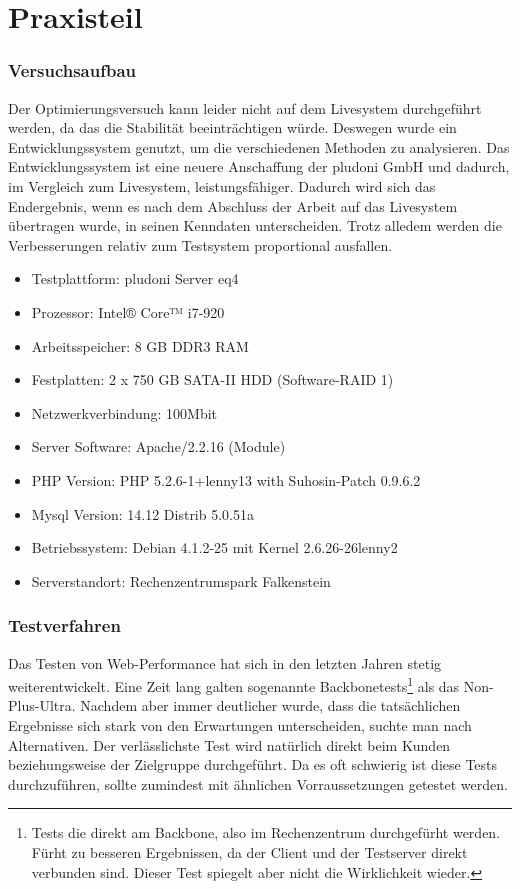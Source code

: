 \part{Praxisteil}

\section{Versuchsaufbau}
Der Optimierungsversuch kann leider nicht auf dem Livesystem durchgeführt werden, da das die Stabilität beeinträchtigen würde. Deswegen wurde ein Entwicklungssystem genutzt, um die verschiedenen Methoden zu analysieren. Das Entwicklungssystem ist eine neuere Anschaffung der pludoni GmbH und dadurch, im Vergleich zum Livesystem, leistungsfähiger. Dadurch wird sich das Endergebnis, wenn es nach dem Abschluss der Arbeit auf das Livesystem übertragen wurde, in seinen Kenndaten unterscheiden. Trotz alledem werden die Verbesserungen relativ zum Testsystem proportional ausfallen. 

\begin{itemize}
 \item Testplattform: pludoni Server eq4
  \item Prozessor: Intel® Core™ i7-920 
  \item Arbeitsspeicher: 8 GB DDR3 RAM
  \item Festplatten: 2 x 750 GB SATA-II HDD (Software-RAID 1)
  \item Netzwerkverbindung: 100Mbit
  \item Server Software: Apache/2.2.16 (Module)
  \item PHP Version: PHP 5.2.6-1+lenny13 with Suhosin-Patch 0.9.6.2
  \item Mysql Version: 14.12 Distrib 5.0.51a 
  \item Betriebssystem: Debian 4.1.2-25 mit Kernel 2.6.26-26lenny2
  \item Serverstandort: Rechenzentrumspark Falkenstein
\end{itemize}

\section{Testverfahren}
Das Testen von Web-Performance hat sich in den letzten Jahren stetig weiterentwickelt. Eine Zeit lang galten sogenannte Backbonetests\footnote{Tests die direkt am Backbone, also im Rechenzentrum durchgef\"urht werden. F\"urht zu besseren Ergebnissen, da der Client und der Testserver direkt verbunden sind. Dieser Test spiegelt aber nicht die Wirklichkeit wieder.} als das Non-Plus-Ultra. Nachdem aber immer deutlicher wurde, dass die tatsächlichen Ergebnisse sich stark von den Erwartungen unterscheiden, suchte man nach Alternativen. Der verlässlichste Test wird natürlich direkt beim Kunden beziehungsweise der Zielgruppe durchgeführt. Da es oft schwierig ist diese Tests durchzuführen, sollte zumindest mit ähnlichen Vorraussetzungen getestet werden.
